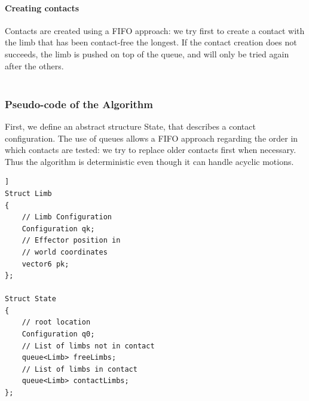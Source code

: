\documentclass[journal]{IEEEtran}
\newcommand{\deladp}[1]{\deleted[id=adp]{#1}}
\providecommand{\DIFaddtex}[1]{#1} %
\providecommand{\DIFaddbegin}{\protect\color{blue}} %
\providecommand{\DIFaddend}{\protect\color{black}} %
\providecommand{\DIFadd}[1]{\texorpdfstring{\DIFaddtex{#1}}{#1}} %
\begin{document}
\paragraph{Creating contacts}
Contacts are created using a FIFO approach: we try first to create a contact with the limb that has been contact-free the longest. If the contact creation does not succeeds, the limb is pushed on top of the queue, and will only be tried again after the others. \DIFaddbegin \\ \\
\DIFaddend %



\DIFaddbegin \subsubsection{\DIFadd{Pseudo-code of the Algorithm}}
\label{app:contact}


\DIFadd{First, we define an abstract structure State,
that describes a contact configuration.
The use of queues allows a FIFO approach regarding the order 
in which contacts are tested: we try to replace older contacts first when necessary.
Thus the algorithm is deterministic even though it can handle acyclic motions. }\\

\begin{lstlisting}]
Struct Limb
{
    // Limb Configuration
    Configuration qk;
    // Effector position in
    // world coordinates
    vector6 pk;
};

Struct State
{
    // root location
    Configuration q0;
    // List of limbs not in contact
    queue<Limb> freeLimbs;
    // List of limbs in contact
    queue<Limb> contactLimbs;
};
\end{lstlisting}
\end{document}
